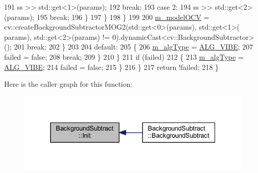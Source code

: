 \begin{DoxyCode}
191                         ss >> std::get<1>(params);
192                         \textcolor{keywordflow}{break};
193                     \textcolor{keywordflow}{case} 2:
194                         ss >> std::get<2>(params);
195                         \textcolor{keywordflow}{break};
196                     \}
197                 \}
198             \}
199 
200             \mbox{\hyperlink{class_background_subtract_a80782a38138a430437095f625603e599}{m\_modelOCV}} = cv::createBackgroundSubtractorMOG2(std::get<0>(params), std::get<1>(
      params), std::get<2>(params) != 0).dynamicCast<cv::BackgroundSubtractor>();
201             \textcolor{keywordflow}{break};
202         \}
203 
204         \textcolor{keywordflow}{default}:
205         \{
206             \mbox{\hyperlink{class_background_subtract_a3d569052b6954fa87f04a0aa8a970f97}{m\_algType}} = \mbox{\hyperlink{class_background_subtract_a56850081696df68b55f87b4f3d87949fa1905f812773a0029b59688e57990f172}{ALG\_VIBE}};
207             failed = \textcolor{keyword}{false};
208             \textcolor{keywordflow}{break};
209         \}
210         \}
211         \textcolor{keywordflow}{if} (failed)
212         \{
213             \mbox{\hyperlink{class_background_subtract_a3d569052b6954fa87f04a0aa8a970f97}{m\_algType}} = \mbox{\hyperlink{class_background_subtract_a56850081696df68b55f87b4f3d87949fa1905f812773a0029b59688e57990f172}{ALG\_VIBE}};
214             failed = \textcolor{keyword}{false};
215         \}
216     \}
217     \textcolor{keywordflow}{return} !failed;
218 \}
\end{DoxyCode}
Here is the caller graph for this function\+:\nopagebreak
\begin{figure}[H]
\begin{center}
\leavevmode
\includegraphics[width=332pt]{class_background_subtract_a9dacb4cc5cf41c4a37cc776a8142aecc_icgraph}
\end{center}
\end{figure}
\mbox{\label{class_background_subtract_a1cd989730164da1c2523975d2ed32147}} 
